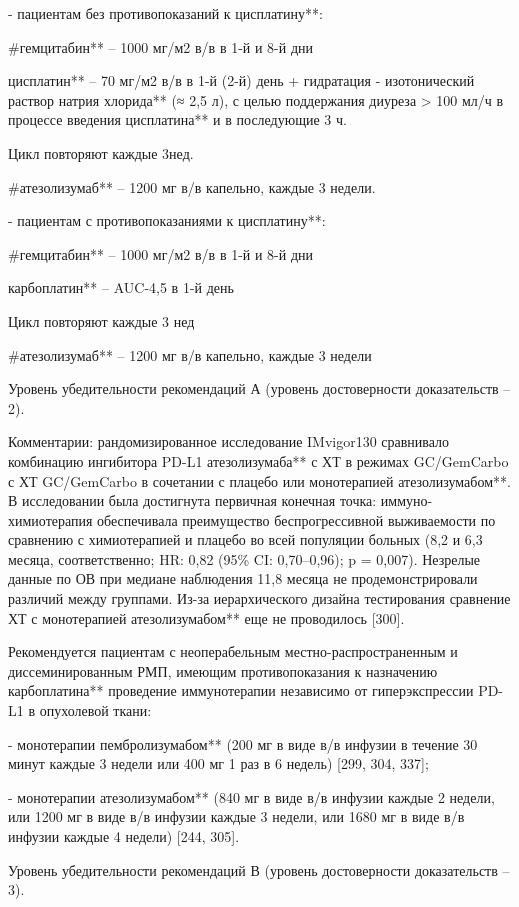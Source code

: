 - пациентам без противопоказаний к цисплатину**:

#гемцитабин** – 1000 мг/м2 в/в в 1-й и 8-й дни

цисплатин** – 70 мг/м2 в/в в 1-й (2-й) день + гидратация - изотонический раствор натрия хлорида** (≈ 2,5 л), с целью поддержания диуреза > 100 мл/ч в процессе введения цисплатина** и в последующие 3 ч.

Цикл повторяют каждые 3нед.

#атезолизумаб** – 1200 мг в/в капельно, каждые 3 недели.

- пациентам с противопоказаниями к цисплатину**:

#гемцитабин** – 1000 мг/м2 в/в в 1-й и 8-й дни

карбоплатин** – AUC-4,5 в 1-й день

Цикл повторяют каждые 3 нед

#атезолизумаб** – 1200 мг в/в капельно, каждые 3 недели

Уровень убедительности рекомендаций А (уровень достоверности доказательств – 2).

Комментарии: рандомизированное исследование IMvigor130 сравнивало комбинацию ингибитора PD-L1 атезолизумаба** с ХТ в режимах GC/GemCarbo с ХТ GC/GemCarbo в сочетании с плацебо или монотерапией атезолизумабом**. В исследовании была достигнута первичная конечная точка: иммуно-химиотерапия обеспечивала преимущество беспрогрессивной выживаемости по сравнению с химиотерапией и плацебо во всей популяции больных (8,2 и 6,3 месяца, соответственно; HR: 0,82 (95\% CI: 0,70–0,96); p = 0,007). Незрелые данные по ОВ при медиане наблюдения 11,8 месяца не продемонстрировали различий между группами. Из-за иерархического дизайна тестирования сравнение ХТ с монотерапией атезолизумабом** еще не проводилось [300].

Рекомендуется пациентам с неоперабельным местно-распространенным и диссеминированным РМП, имеющим противопоказания к назначению карбоплатина** проведение иммунотерапии независимо от гиперэкспрессии PD-L1 в опухолевой ткани:

- монотерапии пембролизумабом** (200 мг в виде в/в инфузии в течение 30 минут каждые 3 недели или 400 мг 1 раз в 6 недель) [299, 304, 337];

- монотерапии атезолизумабом** (840 мг в виде в/в инфузии каждые 2 недели, или 1200 мг в виде в/в инфузии каждые 3 недели, или 1680 мг в виде в/в инфузии каждые 4 недели) [244, 305].

Уровень убедительности рекомендаций В (уровень достоверности доказательств – 3).

